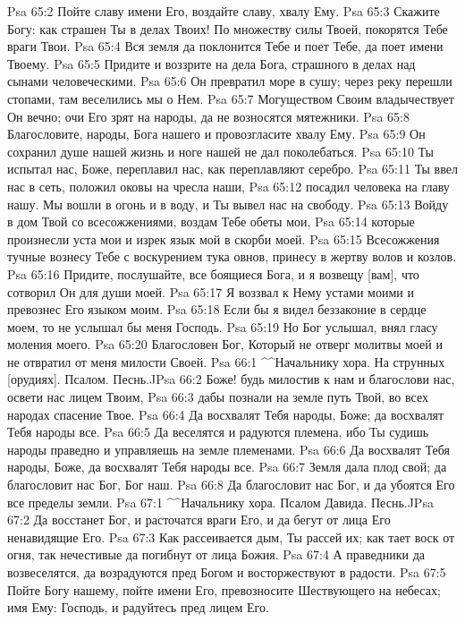 Psa 65:2  Пойте славу имени Его, воздайте славу, хвалу Ему.
Psa 65:3  Скажите Богу: как страшен Ты в делах Твоих! По множеству силы Твоей, покорятся Тебе враги Твои.
Psa 65:4  Вся земля да поклонится Тебе и поет Тебе, да поет имени Твоему.
Psa 65:5  Придите и воззрите на дела Бога, страшного в делах над сынами человеческими.
Psa 65:6  Он превратил море в сушу; через реку перешли стопами, там веселились мы о Нем.
Psa 65:7  Могуществом Своим владычествует Он вечно; очи Его зрят на народы, да не возносятся мятежники.
Psa 65:8  Благословите, народы, Бога нашего и провозгласите хвалу Ему.
Psa 65:9  Он сохранил душе нашей жизнь и ноге нашей не дал поколебаться.
Psa 65:10  Ты испытал нас, Боже, переплавил нас, как переплавляют серебро.
Psa 65:11  Ты ввел нас в сеть, положил оковы на чресла наши,
Psa 65:12  посадил человека на главу нашу. Мы вошли в огонь и в воду, и Ты вывел нас на свободу.
Psa 65:13  Войду в дом Твой со всесожжениями, воздам Тебе обеты мои,
Psa 65:14  которые произнесли уста мои и изрек язык мой в скорби моей.
Psa 65:15  Всесожжения тучные вознесу Тебе с воскурением тука овнов, принесу в жертву волов и козлов.
Psa 65:16  Придите, послушайте, все боящиеся Бога, и я возвещу [вам], что сотворил Он для души моей.
Psa 65:17  Я воззвал к Нему устами моими и превознес Его языком моим.
Psa 65:18  Если бы я видел беззаконие в сердце моем, то не услышал бы меня Господь.
Psa 65:19  Но Бог услышал, внял гласу моления моего.
Psa 65:20  Благословен Бог, Который не отверг молитвы моей и не отвратил от меня милости Своей.
Psa 66:1  ^^Начальнику хора. На струнных [орудиях]. Псалом. Песнь.^^
Psa 66:2  Боже! будь милостив к нам и благослови нас, освети нас лицем Твоим,
Psa 66:3  дабы познали на земле путь Твой, во всех народах спасение Твое.
Psa 66:4  Да восхвалят Тебя народы, Боже; да восхвалят Тебя народы все.
Psa 66:5  Да веселятся и радуются племена, ибо Ты судишь народы праведно и управляешь на земле племенами.
Psa 66:6  Да восхвалят Тебя народы, Боже, да восхвалят Тебя народы все.
Psa 66:7  Земля дала плод свой; да благословит нас Бог, Бог наш.
Psa 66:8  Да благословит нас Бог, и да убоятся Его все пределы земли.
Psa 67:1  ^^Начальнику хора. Псалом Давида. Песнь.^^
Psa 67:2  Да восстанет Бог, и расточатся враги Его, и да бегут от лица Его ненавидящие Его.
Psa 67:3  Как рассеивается дым, Ты рассей их; как тает воск от огня, так нечестивые да погибнут от лица Божия.
Psa 67:4  А праведники да возвеселятся, да возрадуются пред Богом и восторжествуют в радости.
Psa 67:5  Пойте Богу нашему, пойте имени Его, превозносите Шествующего на небесах; имя Ему: Господь, и радуйтесь пред лицем Его.
